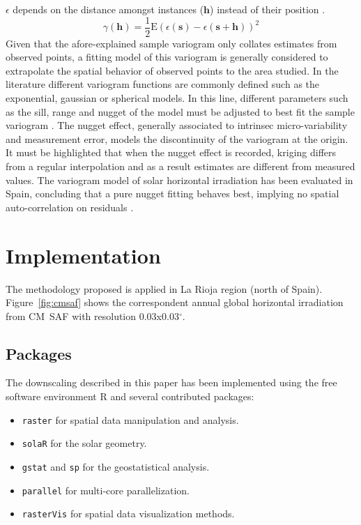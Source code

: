 \documentclass[authoryear, sort&compress]{elsarticle}
\begin{document}
$\epsilon$ depends on the distance amongst instances
($\mathbf{h}$) instead of their position
\citep{Pebesma2004}.
\begin{equation}
\label{eq:variogram}
\gamma(\mathbf{h}) = \frac{1}{2} \textrm{E}(\epsilon(\mathbf{s}) -
\epsilon(\mathbf{s} + \mathbf{h}))^2
\end{equation}
Given that the afore-explained sample variogram only collates
estimates from observed points, a fitting model of this variogram
is generally considered to extrapolate the spatial behavior of
observed points to the area studied. In the literature different
variogram functions are commonly defined such as the exponential,
gaussian or spherical models. In this line, different parameters
such as the sill, range and nugget of the model must be adjusted
to best fit the sample variogram \citep{Hengl2009}. The nugget
effect, generally associated to intrinsec micro-variability and
measurement error, models the discontinuity of the variogram at
the origin. It must be highlighted that when the nugget effect is
recorded, kriging differs from a regular interpolation and as a
result estimates are different from measured values. The variogram
model of solar horizontal irradiation has been evaluated in Spain,
concluding that a pure nugget fitting behaves best, implying no
spatial auto-correlation on residuals
\citep{Antonanzas-Torres.Canizares.ea2013}.
\section{Implementation}
\label{sec-1}
The methodology proposed is applied in La Rioja region (north of
Spain). Figure~\ref{fig:cmsaf} shows the correspondent annual
global horizontal irradiation from CM~SAF with resolution
0.03x0.03$^\circ$. 
\subsection{Packages}
\label{sec-1-1}
The downscaling described in this paper has been implemented using
the free software environment R \citep{proglangRDevelopmentCoreTeam2013}
and several contributed packages:
\begin{itemize}
\item \texttt{raster} \citep{Hijmans.Etten2013} for spatial data manipulation
and analysis.
\item \texttt{solaR} \citep{Perpinan-Lamigueiro2012} for the solar
geometry.
\item \texttt{gstat} \citep{Pebesma.Graeler2013} and \texttt{sp}
\citep{Pebesma.Bivand.ea2013} for the geostatistical analysis.
\item \texttt{parallel} for multi-core parallelization.
\item \texttt{rasterVis} \citep{Perpinan-Lamiguiero.Hijmans2013} for spatial data
visualization methods.
\end{itemize}
\end{document}
